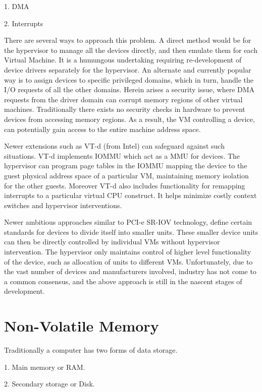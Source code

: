 1. DMA 

2. Interrupts 

There are several ways to approach this problem. A direct method would be for the hypervisor to manage all the devices directly, and then emulate them for each Virtual Machine. It is a humungous undertaking requiring re-development of  device drivers separately for the hypervisor. An alternate and currently popular way is to assign devices to specific privileged domains, which in turn, handle the I/O requests of all the other domains. Herein arises a security issue, where DMA requests from the driver domain can corrupt memory regions of other virtual machines. Traditionally there exists no security checks in hardware to prevent devices from accessing memory regions. As a result, the VM controlling a device, can potentially gain access to the entire machine address space. 

 

Newer extensions such as VT-d (from Intel) can safeguard against such situations. VT-d implements IOMMU which act as a MMU for devices. The hypervisor can program page tables in the IOMMU mapping the device to the guest physical address space of a particular VM, maintaining memory isolation for the other guests. Moreover VT-d also includes functionality for remapping interrupts to a particular virtual CPU construct. It helps minimize costly context switches and hypervisor interventions. 

 

Newer ambitious approaches similar to PCI-e SR-IOV technology, define certain standards for devices to divide itself into smaller units. These smaller device units can then be directly controlled by individual VMs without hypervisor intervention. The hypervisor only maintains control of higher level functionality of the device, such as allocation of units to different VMs. Unfortunately, due to the vast number of devices and manufacturers involved, industry has not come to a common consensus, and the above approach is still in the nascent stages of development. 

\section{Non-Volatile Memory}

Traditionally a computer has two forms of data storage.

1. Main memory or RAM.

2. Secondary storage or Disk.

